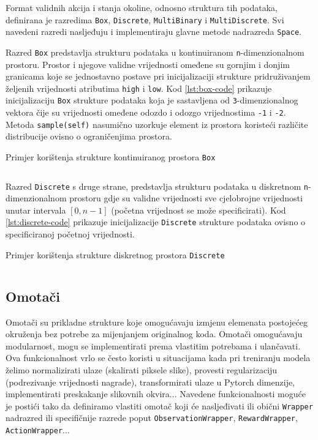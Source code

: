 Format validnih akcija i stanja okoline, odnosno struktura tih podataka, definirana je razredima \texttt{Box}, \texttt{Discrete}, \texttt{MultiBinary} i \texttt{MultiDiscrete}. Svi navedeni razredi nasljeđuju i implementiraju glavne metode nadrazreda \texttt{Space}. 

Razred \texttt{Box} predstavlja strukturu podataka u kontinuiranom \texttt{n}-dimenzionalnom prostoru. Prostor i njegove validne vrijednosti omeđene su gornjim i donjim granicama koje se jednostavno postave pri inicijalizaciji strukture pridruživanjem željenih vrijednosti atributima \texttt{high} i \texttt{low}. Kod \ref{lst:box-code} prikazuje inicijalizaciju \texttt{Box} strukture podataka koja je sastavljena od \texttt{3}-dimenzionalnog vektora čije su vrijednosti omeđene odozdo i odozgo vrijednostima \texttt{-1} i \texttt{-2}. Metoda \texttt{sample(self)} nasumično uzorkuje element iz prostora koristeći različite distribucije ovisno o ograničenjima prostora.

\begin{listing}[H]
    \caption{Primjer korištenja strukture kontinuiranog prostora \texttt{Box}}
    \inputminted{python}{snippets/box.txt}
    \label{lst:box-code}
\end{listing}

Razred \texttt{Discrete} s druge strane, predstavlja strukturu podataka u diskretnom \texttt{n}-dimenzionalnom prostoru gdje su validne vrijednosti sve cjelobrojne vrijednosti unutar intervala $[0, n-1]$ (početna vrijednost se može specificirati). Kod \ref{lst:discrete-code} prikazuje inicijalizacije \texttt{Discrete} strukture podataka ovisno o specificiranoj početnoj vrijednosti.

\begin{listing}[H]
    \caption{Primjer korištenja strukture diskretnog prostora \texttt{Discrete}}
    \inputminted{python}{snippets/discrete.txt}
    \label{lst:discrete-code}
\end{listing}

\subsection{Omotači}

Omotači  su prikladne strukture koje omogućavaju izmjenu elemenata postojećeg okruženja bez potrebe za mijenjanjem originalnog koda. Omotači omogućavaju modularnost, mogu se implementirati prema vlastitim potrebama i ulančavati. Ova funkcionalnost vrlo se često koristi u situacijama kada pri treniranju modela želimo normalizirati ulaze (skalirati piksele slike), provesti regularizaciju (podrezivanje vrijednosti nagrade), transformirati ulaze u Pytorch dimenzije, implementirati preskakanje slikovnih okvira...  Navedene funkcionalnosti moguće je postići tako da definiramo vlastiti omotač koji će nasljeđivati ili obični \texttt{Wrapper} nadrazred ili specifičnije razrede poput \texttt{ObservationWrapper}, \texttt{RewardWrapper}, \texttt{ActionWrapper}...

